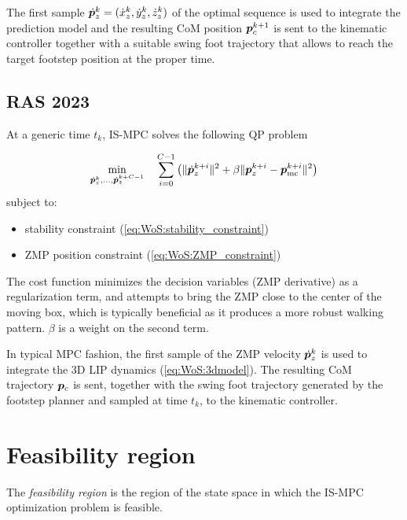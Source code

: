The first sample $\dot {{\bm{p}}}_z^k = (\dot x_z^k, \dot y_z^k, \dot z_z^k)$ of the optimal sequence is used to integrate the prediction model and the resulting CoM position ${\bm{p}}_c^{k+1}$ is sent to the kinematic controller together with a suitable swing foot trajectory that allows to reach the target footstep position at the proper time.

\subsection{RAS 2023}
At a generic time $t_k$, IS-MPC solves the following QP problem

\begin{braced}
\[
\min_{\dot {{\bm{p}}}_z^k, \dots, \dot {{\bm{p}}}_z^{k+C-1}} \quad \sum_{i=0}^{C-1} \left(\|\dot{{\bm{p}}}_z^{k+i}\|^2 + \beta\|{\bm{p}}_z^{k+i} - {\bm{p}}_{\rm mc}^{k+i}\|^2\right)
\]
\hspace{0.25cm} subject to:
\begin{itemize}
\item stability constraint (\ref{eq:WoS:stability_constraint})
\item ZMP position constraint (\ref{eq:WoS:ZMP_constraint})
\end{itemize}
\end{braced}
The cost function minimizes the decision variables (ZMP derivative) as a regularization term, and attempts to bring the ZMP close to the center of the moving box, which is typically beneficial as it produces a more robust walking pattern. $\beta$ is a weight on the second term.

In typical MPC fashion, the first sample of the ZMP velocity $\dot {{\bm{p}}}_z^k$ is used to integrate the 3D LIP dynamics (\ref{eq:WoS:3dmodel}). The resulting CoM trajectory ${\bm{p}}_c$ is sent, together with the swing foot trajectory generated by the footstep planner and sampled at time $t_k$, to the kinematic controller.


\section{Feasibility region}

The {\em feasibility region} is the region of the state space in which the IS-MPC optimization problem is feasible.

